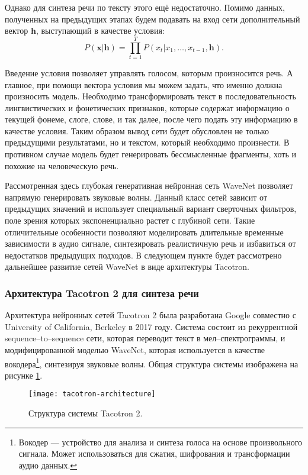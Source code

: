 Однако для синтеза речи по тексту этого ещё недостаточно. Помимо данных, полученных на предыдущих этапах будем подавать на вход сети дополнительный вектор $\mathbf{h}$, выступающий в качестве условия:
$$P(\mathbf{x} | \mathbf{h}) = \prod_{t = 1}^{T} P(x_t | x_1, \dots, x_{t - 1}, \mathbf{h}).$$

Введение условия позволяет управлять голосом, которым произносится речь. А главное, при помощи вектора условия мы можем задать, что именно должна произносить модель. Необходимо трансформировать текст в последовательность лингвистических и фонетических признаков, которые содержат информацию о текущей фонеме, слоге, слове, и так далее, после чего подать эту информацию в качестве условия. Таким образом вывод сети будет обусловлен не только предыдущими результатами, но и текстом, который необходимо произнести. В противном случае модель будет генерировать бессмысленные фрагменты, хоть и похожие на человеческую речь.

Рассмотренная здесь глубокая генеративная нейронная сеть WaveNet позволяет напрямую генерировать звуковые волны. Данный класс сетей зависит от предыдущих значений и использует специальный вариант сверточных фильтров, поле зрения которых экспоненциально растет с глубиной сети. Такие отличительные особенности позволяют моделировать длительные временные зависимости в аудио сигнале, синтезировать реалистичную речь и избавиться от недостатков предыдущих подходов. В следующем пункте будет рассмотрено дальнейшее развитие сетей WaveNet в виде архитектуры Tacotron.

\subsubsection{Архитектура Tacotron 2 для синтеза речи}
Архитектура нейронных сетей Tacotron 2 была разработана Google совместно с University of California, Berkeley в 2017 году\cite{shen2018natural}. Система состоит из рекуррентной sequence--to--sequence сети, которая переводит текст в мел--спектрограммы, и модифицированной моделью WaveNet, которая используется в качестве вокодера\footnote{Вокодер --- устройство для анализа и синтеза голоса на основе произвольного сигнала. Может использоваться для сжатия, шифрования и трансформации аудио данных.}, синтезируя звуковые волны. Общая структура системы изображена на рисунке \ref{fig:tacotron-architecture}.

\begin{figure}[h]
	\centering
	\texttt{[image: tacotron-architecture]}
	\caption{Структура системы Tacotron 2.}
	\label{fig:tacotron-architecture}
\end{figure}

